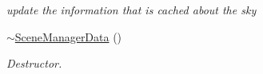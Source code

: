\begin{DoxyCompactItemize}
\begin{DoxyCompactList}\small\item\em update the information that is cached about the sky \item\end{DoxyCompactList}\item 
\hypertarget{classphys_1_1internal_1_1SceneManagerData_ae6beb4cb09d964ec3e02d8a3e28c13a7}{
\hyperlink{classphys_1_1internal_1_1SceneManagerData_ae6beb4cb09d964ec3e02d8a3e28c13a7}{$\sim$SceneManagerData} ()}
\label{classphys_1_1internal_1_1SceneManagerData_ae6beb4cb09d964ec3e02d8a3e28c13a7}

\begin{DoxyCompactList}\small\item\em Destructor. \item\end{DoxyCompactList}\end{DoxyCompactItemize}
